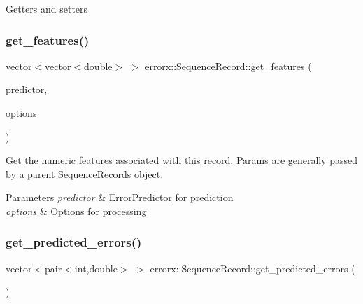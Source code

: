 Getters and setters \mbox{\label{classerrorx_1_1_sequence_record_ac2e7ec6eff313310ba457d9e374b3c88}} 
\subsubsection{\texorpdfstring{get\+\_\+features()}{get\_features()}}
{\footnotesize\ttfamily vector$<$vector$<$double$>$ $>$ errorx\+::\+Sequence\+Record\+::get\+\_\+features (\begin{DoxyParamCaption}\item[{\mbox{\hyperlink{classerrorx_1_1_error_predictor}{Error\+Predictor}} const \&}]{predictor,  }\item[{\mbox{\hyperlink{classerrorx_1_1_error_x_options}{Error\+X\+Options}} const \&}]{options }\end{DoxyParamCaption})}

Get the numeric features associated with this record. Params are generally passed by a parent \mbox{\hyperlink{classerrorx_1_1_sequence_records}{Sequence\+Records}} object.


\begin{DoxyParams}{Parameters}
{\em predictor} & \mbox{\hyperlink{classerrorx_1_1_error_predictor}{Error\+Predictor}} for prediction \\
\hline
{\em options} & Options for processing \\
\hline
\end{DoxyParams}
\mbox{\label{classerrorx_1_1_sequence_record_a40aba7774369da0c35b82c14413143a4}} 
\subsubsection{\texorpdfstring{get\+\_\+predicted\+\_\+errors()}{get\_predicted\_errors()}}
{\footnotesize\ttfamily vector$<$pair$<$int,double$>$ $>$ errorx\+::\+Sequence\+Record\+::get\+\_\+predicted\+\_\+errors (\begin{DoxyParamCaption}{ }\end{DoxyParamCaption})}

